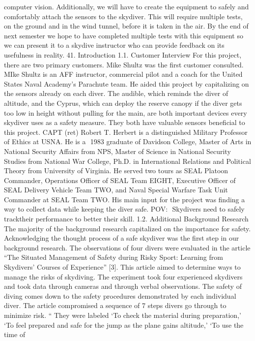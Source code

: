 computer vision. Additionally, we will have to create the equipment to safely and comfortably attach the sensors to the
skydiver. This will require multiple tests, on the ground and in the wind tunnel, before it is taken in the air. By the end of
next semester we hope to have completed multiple tests with this equipment so we can present it to a skydive
instructor who can provide feedback on its usefulness in reality.
41.
Introduction
1.1.
Customer Interview
For this project, there are two primary customers. Mike Shultz was the first customer consulted. MIke Shultz is an AFF
instructor, commercial pilot and a coach for the United States Naval Academy’s Parachute team. He aided this project by
capitalizing on the sensors already on each diver. The audible, which reminds the diver of altitude, and the Cyprus, which
can deploy the reserve canopy if the diver gets too low in height without pulling for the main, are both important
devices every skydiver uses as a safety measure. They both have valuable sensors beneficial to this project.
CAPT (ret) Robert T. Herbert is a distinguished Military Professor of Ethics at USNA. He is a ​ 1983 graduate of Davidson
College, Master of Arts in National Security Affairs from NPS, Master of Science in National Security Studies from
National War College, Ph.D. in International Relations and Political Theory from University of Virginia. He served two
tours as SEAL Platoon Commander, Operations Officer of SEAL Team EIGHT, Executive Officer of SEAL Delivery Vehicle
Team TWO, and Naval Special Warfare Task Unit Commander at SEAL Team TWO. His main input for the project was
finding a way to collect data while keeping the diver safe.
POV: ​ Skydivers​ need to safely ​ track​ their performance to better their skill.
1.2.
Additional Background Research
The majority of the background research capitalized on the importance for safety.
Acknowledging the thought process of a safe skydiver was the first step in our background research. The observations of
four divers were evaluated in the article “The Situated Management of Safety during Risky Sport: Learning from
Skydivers’ Courses of Experience” [3]. This article aimed to determine ways to manage the risks of skydiving. The
experiment took four experienced skydivers and took data through cameras and through verbal observations. The safety
of diving comes down to the safety procedures demonstrated by each individual diver.
The article compromised a sequence of 7 steps divers go through to minimize risk. “​ They were labeled ‘To check the
material during preparation,’ ‘To feel prepared and safe for the jump as the plane gains altitude,’ ‘To use the time of
